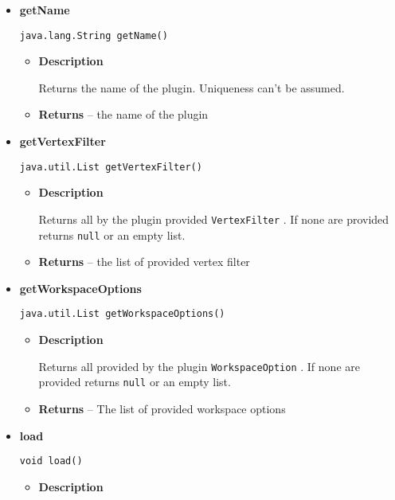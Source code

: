 {{{{{{{{{{\begin{itemize}
{\begin{itemize}
{Returns all by the plugin provided \texttt{\small EdgeFilter}{\small 
{}}. If none are provided returns \texttt{\small null} or an empty list.
}
\item{{\bf  Returns} -- 
the list of provided edge filter 
}%
\end{itemize}
}%
\item{ 
{\bf  getName}\\
\begin{lstlisting}[frame=none]
java.lang.String getName()\end{lstlisting} %
\begin{itemize}
\item{
{\bf  Description}

Returns the name of the plugin. Uniqueness can't be assumed.
}
\item{{\bf  Returns} -- 
the name of the plugin 
}%
\end{itemize}
}%
\item{ 
{\bf  getVertexFilter}\\
\begin{lstlisting}[frame=none]
java.util.List getVertexFilter()\end{lstlisting} %
\begin{itemize}
\item{
{\bf  Description}

Returns all by the plugin provided \texttt{\small VertexFilter}{\small 
{}}. If none are provided returns \texttt{\small null} or an empty list.
}
\item{{\bf  Returns} -- 
the list of provided vertex filter 
}%
\end{itemize}
}%
\item{ 
{\bf  getWorkspaceOptions}\\
\begin{lstlisting}[frame=none]
java.util.List getWorkspaceOptions()\end{lstlisting} %
\begin{itemize}
\item{
{\bf  Description}

Returns all provided by the plugin \texttt{\small WorkspaceOption}{\small 
{}}. If none are provided returns \texttt{\small null} or an empty list.
}
\item{{\bf  Returns} -- 
The list of provided workspace options 
}%
\end{itemize}
}%
\item{ 
{\bf  load}\\
\begin{lstlisting}[frame=none]
void load()\end{lstlisting} %
\begin{itemize}
\item{
{\bf  Description}

}
\end{itemize}}
\end{itemize}}}}}}}}}}}
